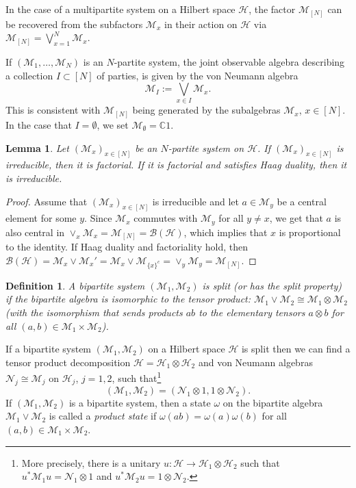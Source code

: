 \documentclass[a4paper, 10pt, onecolumn, accepted=2025-07-22]{quantumarticle}
\newtheorem{lemma}[theorem]{Lemma}
\newtheorem{definition}[theorem]{Definition}
\theoremstyle{definition}
\newcommand{\ox}{\otimes}
\newcommand{\mc}{\mathcal}
\def\B{{\mc B}}
\def\CC{{\mathbb C}}
\def\H{{\mc H}}
\def\M{{\mc M}}
\def\N{{\mc N}}
\newcommand*{\1}{\text{\usefont{U}{bbold}{m}{n}1}}
\begin{document}
In the case of a multipartite system on a Hilbert space $\H$, the factor $\M_{[N]}$ can be recovered from the subfactors $\M_x$ in their action on $\H$ via $\M_{[N]}= \bigvee_{x=1}^N \M_x$.

If $(\M_1,\ldots,\M_N)$ is an $N$-partite system, the joint observable algebra describing a collection $I\subset [N]$ of parties, is given by the von Neumann algebra
\begin{equation}
    \M_I := \bigvee_{x\in I}\M_x.
\end{equation}
This is consistent with $\M_{[N]}$ being generated by the subalgebras $\M_x$, $x\in [N]$.
In the case that $I=\emptyset$, we set $\M_\emptyset=\CC1$.

\begin{lemma}
    Let $(\M_x)_{x\in[N]}$ be an $N$-partite system on $\H$.
    If $(\M_x)_{x\in[N]}$ is irreducible, then it is factorial.
    If it is factorial and satisfies Haag duality, then it is irreducible.
\end{lemma}
\begin{proof}
    Assume that $(\M_x)_{x\in[N]}$ is irreducible and let $a \in \M_y$ be a central element for some $y$.
    Since $\M_{x}$ commutes with $\M_{y}$ for all $y\ne x$, we get that $a$ is also central in $\vee_x \M_x = \M_{[N]} = \B(\H)$, which implies that $x$ is proportional to the identity.
    If Haag duality and factoriality hold, then $\B(\H) = \M_x \vee \M_x' = \M_x \vee \M_{\{x\}^c} = \vee_y \M_y = \M_{[N]}$.
\end{proof}

\begin{definition}\label{def:split}
    A bipartite system $(\M_1,\M_2)$ is \emph{split} (or has the split property) if the bipartite algebra is isomorphic to the tensor product: $\M_1\vee \M_2 \cong \M_1\ox \M_2$ (with the isomorphism that sends products $ab$ to the elementary tensors $a\ox b$ for all $(a,b)\in\M_1\times\M_2$).
\end{definition}

If a bipartite system $(\M_1,\M_2)$ on a Hilbert space $\H$ is split then we can find  a tensor product decomposition $\H = \H_1\ox \H_2$ and von Neumann algebras $\N_j\cong \M_j$ on $\H_j$, $j=1,2$, such that\footnote{More precisely, there is a unitary $u:\H \to \H_1\ox\H_2$ such that $u^*\M_1u = \N_1\ox1$ and $u^*\M_2u=1\ox\N_2$.}
\begin{equation}\label{eq:vna_split_tp}
    (\M_1,\M_2) = (\N_1\ox1,1\ox \N_2).
\end{equation}
If $(\M_1,\M_2)$ is a bipartite system, then a state $\omega$ on the bipartite algebra $\M_1\vee\M_2$ is called a \emph{product state} if $\omega(ab)=\omega(a)\omega(b)$ for all $(a,b)\in\M_1\times\M_2$.
\end{document}
